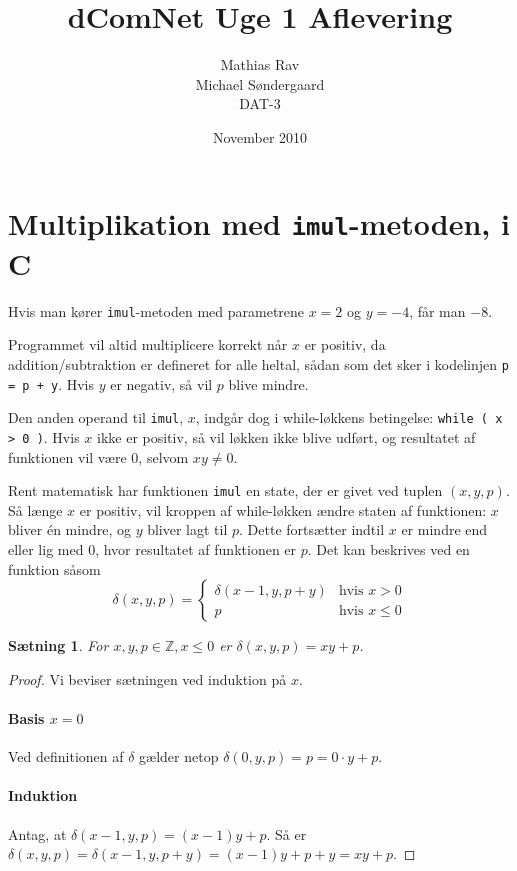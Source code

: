 \documentclass[12pt,a4paper]{article}
\newcommand{\imul}{\texttt{imul}}
\newtheorem{theorem}{Sætning}
\begin{document}
\title{dComNet Uge 1 Aflevering}
\author{Mathias Rav \\
		Michael Søndergaard \\
		DAT-3}
\date{November 2010}
\maketitle

\section{Multiplikation med \imul-metoden, i C}
Hvis man kører \imul-metoden med parametrene $x=2$ og $y=-4$, får man $-8$.

Programmet vil altid multiplicere korrekt når $x$ er positiv, da
addition/subtraktion er defineret for alle heltal, sådan som det sker i
kodelinjen \texttt{p = p + y}. Hvis $y$ er negativ, så vil $p$ blive mindre.

Den anden operand til \imul, $x$, indgår dog i while-løkkens betingelse:
\texttt{while ( x > 0 )}. Hvis $x$ ikke er positiv, så vil løkken ikke blive
udført, og resultatet af funktionen vil være $0$, selvom $xy\ne0$.

Rent matematisk har funktionen \imul{} en state, der er givet ved tuplen
$(x,y,p)$. Så længe $x$ er positiv, vil kroppen af while-løkken ændre staten af
funktionen: $x$ bliver \'en mindre, og $y$ bliver lagt til $p$. Dette fortsætter
indtil $x$ er mindre end eller lig med $0$, hvor resultatet af funktionen er
$p$. Det kan beskrives ved en funktion såsom
\[\delta(x,y,p)=\left\{\begin{array}{cc}
	\delta(x-1,y,p+y) & \text{hvis }x>0 \\
	p & \text{hvis }x\leq 0
\end{array}\right.\]

\begin{theorem}
	For $x,y,p\in\mathbb{Z},x\leq0$ er $\delta(x,y,p)=xy+p$.
\end{theorem}

\begin{proof}
	Vi beviser sætningen ved induktion på $x$.
	\paragraph{Basis $x=0$} Ved definitionen af $\delta$ gælder netop $\delta(0,y,p)=p=0\cdot y+p$.
	\paragraph{Induktion} Antag, at $\delta(x-1,y,p)=(x-1)y+p$. Så er $\delta(x,y,p)=\delta(x-1,y,p+y)=(x-1)y+p+y=xy+p$. \qedhere
\end{proof}
\end{document}
